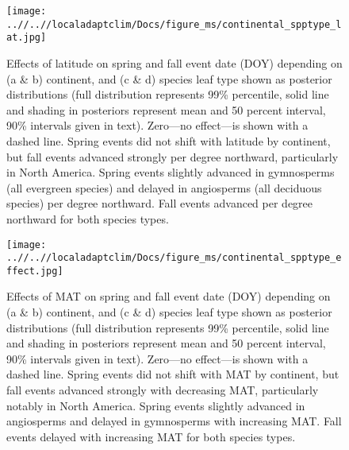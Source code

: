 \documentclass[12pt]{article}
\begin{document}
\begin{figure}[!h] 
    \centering
 \texttt{[image: ..//..//localadaptclim/Docs/figure\_ms/continental\_spptype\_lat.jpg]}
    \caption{Effects of latitude on spring and fall event date (DOY) depending on (a \& b) continent, and (c \& d) species leaf type shown as posterior distributions (full distribution represents 99\% percentile, solid line and shading in posteriors represent mean and 50 percent interval, 90\% intervals given in text). Zero---no effect---is shown with a dashed line. Spring events did not shift with latitude by continent, but fall events advanced strongly per degree northward, particularly in North America. Spring events slightly advanced in gymnosperms (all evergreen species) and delayed in angiosperms (all deciduous species) per degree northward. Fall events advanced per degree northward for both species types.} %
    \label{figure:continental_spptype_lat}
\end{figure}

\begin{figure}[!h] 
    \centering
 \texttt{[image: ..//..//localadaptclim/Docs/figure\_ms/continental\_spptype\_effect.jpg]}
    \caption{Effects of MAT on spring and fall event date (DOY) depending on (a \& b) continent, and (c \& d) species leaf type shown as posterior distributions (full distribution represents 99\% percentile, solid line and shading in posteriors represent mean and 50 percent interval, 90\% intervals given in text). Zero---no effect---is shown with a dashed line. Spring events did not shift with MAT by continent, but fall events advanced strongly with decreasing MAT, particularly notably in North America. Spring events slightly advanced in angiosperms and delayed in gymnosperms with increasing MAT. Fall events delayed with increasing MAT for both species types.}
    \label{figure:continental_spptype_effect}
\end{figure}
\end{document}
